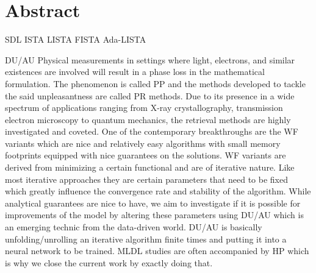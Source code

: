 \chapter*{Abstract}



\acl{SDL} \ac{ISTA} \ac{LISTA} \ac{FISTA} \ac{Ada-LISTA}

\ac{DU}/\ac{AU}
Physical measurements in settings where light, electrons, and similar existences are involved will result in a phase 
loss\cite{Shechtman2015} in the mathematical formulation. The phenomenon is called \acl*{PP}\cite{Shechtman2015} 
and the methods developed to tackle the said unpleasantness are called 
\acl*{PR}\cite{Jaganathan2015}\cite{Liu2019} methods. Due to its presence in a wide spectrum of 
applications\cite{Shechtman2015}\cite{Candes2014} ranging from X-ray crystallography, transmission electron microscopy 
to quantum mechanics, the retrieval methods are highly investigated and coveted\cite{Jaganathan2015}\cite{Liu2019}. 
One of the contemporary breakthroughs are the \ac{WF}\cite{Candes2014}\cite{Liu2019} variants which are nice and relatively easy algorithms 
with small memory footprints equipped with nice guarantees on the solutions. \ac{WF}\cite{Liu2019} variants are derived from minimizing a 
certain functional and are of iterative nature. Like most iterative approaches they are certain parameters that need to be fixed which 
greatly influence the convergence rate and stability of the algorithm. While analytical guarantees are nice to have, we aim 
to investigate if it is possible for improvements of the model by altering these parameters using \ac{DU}/\ac{AU}\cite{Monga2019} 
which is an emerging technic from the data-driven world. \ac{DU}/\ac{AU} is basically unfolding/unrolling an 
iterative algorithm finite times and putting it into a neural network to be trained. \ac{ML}\ac{DL} studies are often accompanied 
by \ac{HP} which is why we close the current work by exactly doing that.   
\endinput